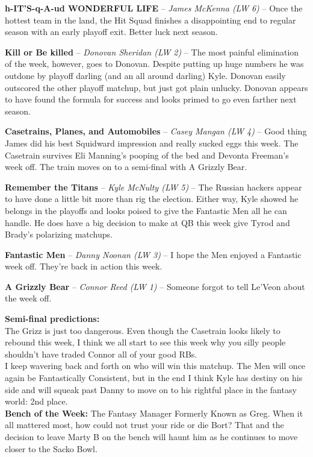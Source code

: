 \documentclass[11pt,letterpaper]{article}
\begin{document}
\begin{etaremune}
\setcounter{enumi}{7}
\item \textbf{h-IT'S-q-A-ud WONDERFUL LIFE} -- \textit{James McKenna (LW 6)} -- Once the hottest team in the land, the Hit Squad finishes a disappointing end to regular season with an early playoff exit. Better luck next season.
\item \textbf{Kill or Be killed} -- \textit{Donovan Sheridan (LW 2)} -- The most painful elimination of the week, however, goes to Donovan. Despite putting up huge numbers he was outdone by playoff darling (and an all around darling) Kyle. Donovan easily outscored the other playoff matchup, but just got plain unlucky. Donovan appears to have found the formula for success and looks primed to go even farther next season. 
\item \textbf{Casetrains, Planes, and Automobiles} -- \textit{Casey Mangan (LW 4)} -- Good thing James did his best Squidward impression and really sucked eggs this week. The Casetrain survives Eli Manning's pooping of the bed and Devonta Freeman's week off. The train moves on to a semi-final with A Grizzly Bear.  
\item \textbf{Remember the Titans} -- \textit{Kyle McNulty (LW 5)} -- The Russian hackers appear to have done a little bit more than rig the election. Either way, Kyle showed he belongs in the playoffs and looks poised to give the Fantastic Men all he can handle. He does have a big decision to make at QB this week give Tyrod and Brady's polarizing matchups. 
\item \textbf{Fantastic Men} -- \textit{Danny Noonan (LW 3)} -- I hope the Men enjoyed a Fantastic week off. They're back in action this week. 
\item \textbf{A Grizzly Bear} -- \textit{Connor Reed (LW 1)} -- Someone forgot to tell Le'Veon about the week off. 
\end{etaremune}
\bigskip\textbf{Semi-final predictions:}
\\The Grizz is just too dangerous. Even though the Casetrain looks likely to rebound this week, I think we all start to see this week why you silly people shouldn't have traded Connor all of your good RBs. 
\bigskip\\ I keep wavering back and forth on who will win this matchup. The Men will once again be Fantastically Consistent, but in the end I think Kyle has destiny on his side and will squeak past Danny to move on to his rightful place in the fantasy world: 2nd place.
\bigskip\\\textbf{Bench of the Week:}
\noindent The Fantasy Manager Formerly Known as Greg. When it all mattered most, how could not trust your ride or die Bort? That and the decision to leave Marty B on the bench will haunt him as he continues to move closer to the Sacko Bowl. 
\end{document}
